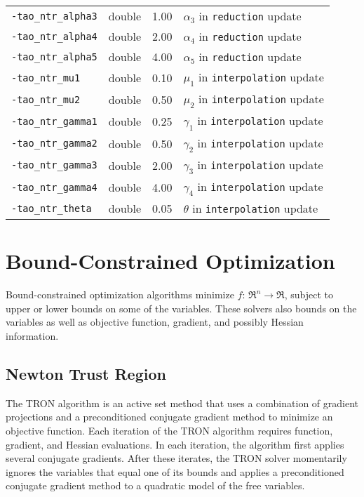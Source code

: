 \begin{table}[h]
\begin{tabular}{l|p{1.5in}|l|p{2.0in}}
{\tt -tao\_ntr\_alpha3} & double & 1.00 & $\alpha_3$ in {\tt reduction} update \\
{\tt -tao\_ntr\_alpha4} & double & 2.00 & $\alpha_4$ in {\tt reduction} update \\
{\tt -tao\_ntr\_alpha5} & double & 4.00 & $\alpha_5$ in {\tt reduction} update \\
{\tt -tao\_ntr\_mu1} & double & 0.10 & $\mu_1$ in {\tt interpolation} update \\
{\tt -tao\_ntr\_mu2} & double & 0.50 & $\mu_2$ in {\tt interpolation} update \\
{\tt -tao\_ntr\_gamma1} & double & 0.25 & $\gamma_1$ in {\tt interpolation} update \\
{\tt -tao\_ntr\_gamma2} & double & 0.50 & $\gamma_2$ in {\tt interpolation} update \\
{\tt -tao\_ntr\_gamma3} & double & 2.00 & $\gamma_3$ in {\tt interpolation} update \\
{\tt -tao\_ntr\_gamma4} & double & 4.00 & $\gamma_4$ in {\tt interpolation} update \\
{\tt -tao\_ntr\_theta} & double & 0.05 & $\theta$ in {\tt interpolation} update \\
\end{tabular}
\end{table}

\section{Bound-Constrained Optimization}
\label{chapter:bound}

Bound-constrained optimization algorithms
minimize $f: \, \Re^n \to \Re$, subject to upper or
lower bounds on some of the variables.
These solvers also bounds on the variables as well as objective
function, gradient, and possibly Hessian information.

\subsection{Newton Trust Region}\label{sec:tron}  
The TRON \cite{lin_c3} algorithm is an active set method that uses a 
combination of gradient projections and 
a preconditioned conjugate gradient method to minimize an objective function.
Each iteration of the TRON algorithm requires function, gradient, 
and Hessian evaluations.  In each iteration, the algorithm
first applies several conjugate
gradients.  
After these iterates, the TRON solver momentarily ignores the variables
that equal one of its bounds and
applies a preconditioned conjugate gradient method to a
quadratic model of the free variables.  


